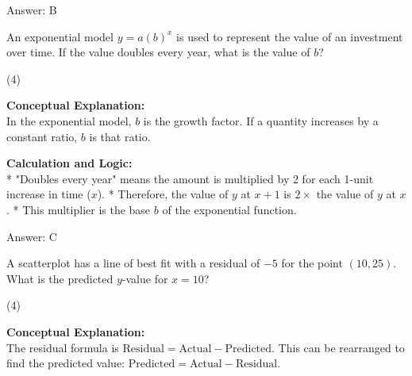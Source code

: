 \documentclass[11pt,paper=a4,answers]{exam}
\begin{document}
\begin{questions}
\begin{solution}
Answer: \colorbox{yellow!100}{B}
\end{solution}

\vspace{60pt}

\question
An exponential model $y = a(b)^x$ is used to represent the value of an investment over time. If the value doubles every year, what is the value of $b$?
\begin{tasks}(4)
\end{tasks}

\begin{solution}
\textbf{Conceptual Explanation:} \\
In the exponential model, $b$ is the growth factor. If a quantity increases by a constant ratio, $b$ is that ratio.

\vspace{30pt}

\textbf{Calculation and Logic:} \\
* "Doubles every year" means the amount is multiplied by 2 for each 1-unit increase in time ($x$).
* Therefore, the value of $y$ at $x+1$ is $2 \times$ the value of $y$ at $x$.
* This multiplier is the base $b$ of the exponential function.

\vspace{30pt}

Answer: \colorbox{yellow!100}{C}
\end{solution}

\vspace{60pt}

\question
A scatterplot has a line of best fit with a residual of $-5$ for the point $(10, 25)$. What is the predicted $y$-value for $x = 10$?
\begin{tasks}(4)
\end{tasks}

\begin{solution}
\textbf{Conceptual Explanation:} \\
The residual formula is $\text{Residual} = \text{Actual} - \text{Predicted}$. This can be rearranged to find the predicted value: $\text{Predicted} = \text{Actual} - \text{Residual}$.

\vspace{30pt}


\end{solution}
\end{questions}
\end{document}
